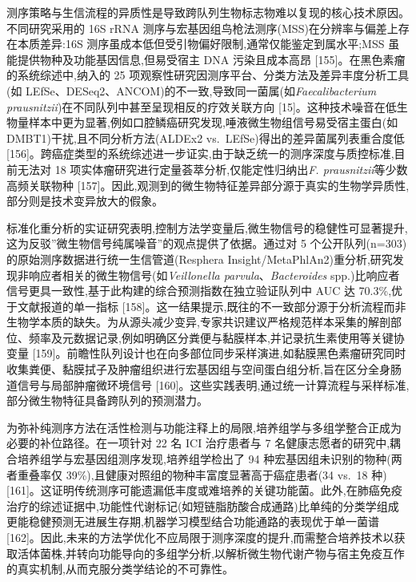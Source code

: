 测序策略与生信流程的异质性是导致跨队列生物标志物难以复现的核心技术原因。不同研究采用的 16S rRNA 测序与宏基因组鸟枪法测序(MSS)在分辨率与偏差上存在本质差异:16S 测序虽成本低但受引物偏好限制,通常仅能鉴定到属水平;MSS 虽能提供物种及功能基因信息,但易受宿主 DNA 污染且成本高昂 {[}155{]}。在黑色素瘤的系统综述中,纳入的 25 项观察性研究因测序平台、分类方法及差异丰度分析工具(如 LEfSe、DESeq2、ANCOM)的不一致,导致同一菌属(如\emph{Faecalibacterium prausnitzii})在不同队列中甚至呈现相反的疗效关联方向 {[}15{]}。这种技术噪音在低生物量样本中更为显著,例如口腔鳞癌研究发现,唾液微生物组信号易受宿主蛋白(如 DMBT1)干扰,且不同分析方法(ALDEx2 vs.~LEfSe)得出的差异菌属列表重合度低 {[}156{]}。跨癌症类型的系统综述进一步证实,由于缺乏统一的测序深度与质控标准,目前无法对 18 项实体瘤研究进行定量荟萃分析,仅能定性归纳出\emph{F. prausnitzii}等少数高频关联物种 {[}157{]}。因此,观测到的微生物特征差异部分源于真实的生物学异质性,部分则是技术变异放大的假象。

标准化重分析的实证研究表明,控制方法学变量后,微生物信号的稳健性可显著提升,这为反驳''微生物信号纯属噪音''的观点提供了依据。通过对 5 个公开队列(n=303)的原始测序数据进行统一生信管道(Resphera Insight/MetaPhlAn2)重分析,研究发现非响应者相关的微生物信号(如\emph{Veillonella parvula}、\emph{Bacteroides} spp.)比响应者信号更具一致性,基于此构建的综合预测指数在独立验证队列中 AUC 达 70.3\%,优于文献报道的单一指标 {[}158{]}。这一结果提示,既往的不一致部分源于分析流程而非生物学本质的缺失。为从源头减少变异,专家共识建议严格规范样本采集的解剖部位、频率及元数据记录,例如明确区分粪便与黏膜样本,并记录抗生素使用等关键协变量 {[}159{]}。前瞻性队列设计也在向多部位同步采样演进,如黏膜黑色素瘤研究同时收集粪便、黏膜拭子及肿瘤组织进行宏基因组与空间蛋白组分析,旨在区分全身肠道信号与局部肿瘤微环境信号 {[}160{]}。这些实践表明,通过统一计算流程与采样标准,部分微生物特征具备跨队列的预测潜力。

为弥补纯测序方法在活性检测与功能注释上的局限,培养组学与多组学整合正成为必要的补位路径。在一项针对 22 名 ICI 治疗患者与 7 名健康志愿者的研究中,耦合培养组学与宏基因组测序发现,培养组学检出了 94 种宏基因组未识别的物种(两者重叠率仅 39\%),且健康对照组的物种丰富度显著高于癌症患者(34 vs.~18 种) {[}161{]}。这证明传统测序可能遗漏低丰度或难培养的关键功能菌。此外,在肺癌免疫治疗的综述证据中,功能性代谢标记(如短链脂肪酸合成通路)比单纯的分类学组成更能稳健预测无进展生存期,机器学习模型结合功能通路的表现优于单一菌谱 {[}162{]}。因此,未来的方法学优化不应局限于测序深度的提升,而需整合培养技术以获取活体菌株,并转向功能导向的多组学分析,以解析微生物代谢产物与宿主免疫互作的真实机制,从而克服分类学结论的不可靠性。

